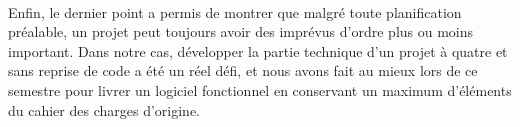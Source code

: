 \paragraph{}
Enfin, le dernier point a permis de montrer que malgré toute planification préalable, un projet peut toujours avoir des imprévus d'ordre plus ou moins important. Dans notre cas, développer la partie technique d'un projet à quatre et sans reprise de code a été un réel défi, et nous avons fait au mieux lors de ce semestre pour livrer un logiciel fonctionnel en conservant un maximum d'éléments du cahier des charges d'origine.